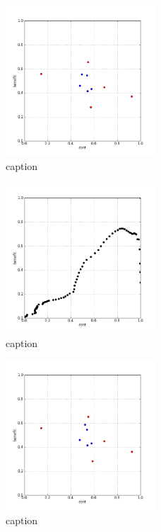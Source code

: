 %
\begin{figure}[!ht]
	\centering
	\includegraphics[width=0.5\textwidth]{img/p1figs/computeFrameStateContrastOnly_simpleCompare_smooth0_tol0.png}
	\caption{caption}
\end{figure}
%
\begin{figure}[!ht]
	\centering
	\includegraphics[width=0.5\textwidth]{img/p1figs/computeFrameStateContrastOnly_simpleCompare_smooth0_tol0_AUC.png}
	\caption{caption}
\end{figure}
%
\begin{figure}[!ht]
	\centering
	\includegraphics[width=0.5\textwidth]{img/p1figs/computeFrameStateContrastOnly_simpleCompare_smooth12_tol0.png}
	\caption{caption}
\end{figure}
